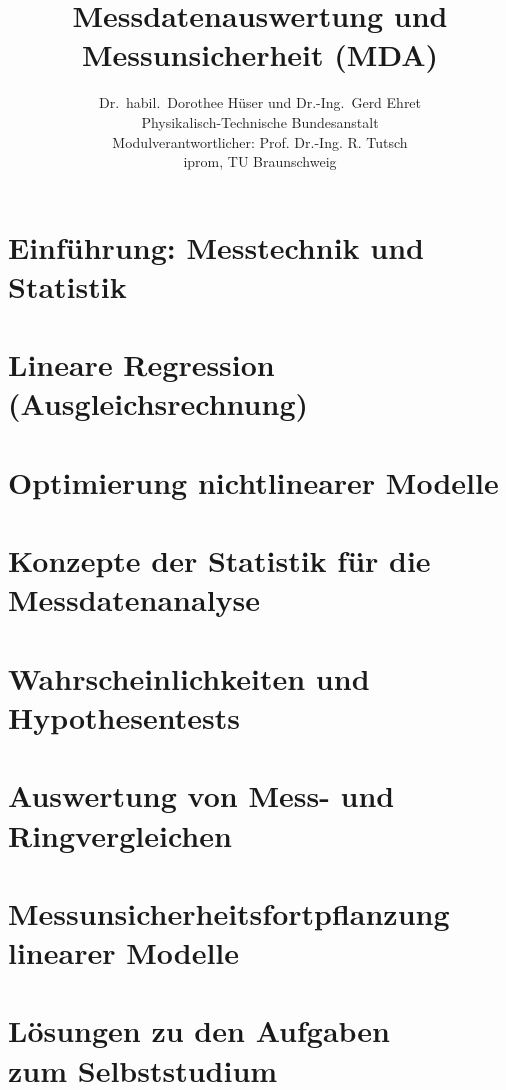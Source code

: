 \documentclass[a4paper,11pt]{book}
\title{\normalfont\sffamily\bfseries{\Huge{Messdatenauswertung und Messunsicherheit (MDA)}}}
\author{Dr.\ habil.\ Dorothee Hüser und Dr.-Ing.\ Gerd Ehret\\
Physikalisch-Technische Bundesanstalt\\
Modulverantwortlicher: Prof. Dr.-Ing. R. Tutsch\\
iprom, TU Braunschweig}
\begin{document}
\frontmatter                            %
\maketitle                              %
\tableofcontents                        %
\mainmatter                             %

\chapter{Einführung: Messtechnik und Statistik}

%
\chapter{Lineare Regression (Ausgleichsrechnung)}
\label{KapitellinReg}

%
\chapter{Optimierung nichtlinearer Modelle}

%
\chapter{Konzepte der Statistik für die Messdatenanalyse}

%
\chapter{Wahrscheinlichkeiten und Hypothesentests}

%
\chapter{Auswertung von Mess- und Ringvergleichen}
%
\chapter{Messunsicherheitsfortpflanzung\\ linearer Modelle}
%
\chapter{Lösungen zu den Aufgaben\\ zum Selbststudium}


\end{document}
